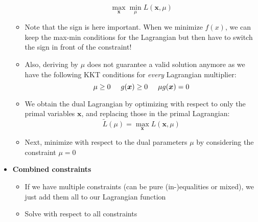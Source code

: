 \begin{itemize}
\begin{itemize}
		$$\max_{\bm{x}} \min_{\mu} L(\bm{x}, \mu)$$
		\item Note that the sign is here important. When we minimize $f(x)$, we can keep the max-min conditions for the Lagrangian but then have to switch the sign in front of the constraint!
		\item Also, deriving by $\mu$ does not guarantee a valid solution anymore as we have the following KKT conditions for \textit{every} Lagrangian multiplier:
		$$\mu \geq 0 \hspace{5mm} g(\bm{x})\geq 0 \hspace{5mm} \mu g(\bm{x}) = 0$$
		\item We obtain the dual Lagrangian by optimizing with respect to only the primal variables $\bm{x}$, and replacing those in the primal Lagrangian:
		$$\tilde{L}(\mu) = \max_{\bm{x}} L(\bm{x},\mu)$$
		\item Next, minimize with respect to the dual parameters $\mu$ by considering the constraint $\mu=0$
	\end{itemize}
	\item \textbf{Combined constraints}
	\begin{itemize}
		\item If we have multiple constraints (can be pure (in-)equalities or mixed), we just add them all to our Lagrangian function
		\item Solve with respect to all constraints
	\end{itemize}
\end{itemize}